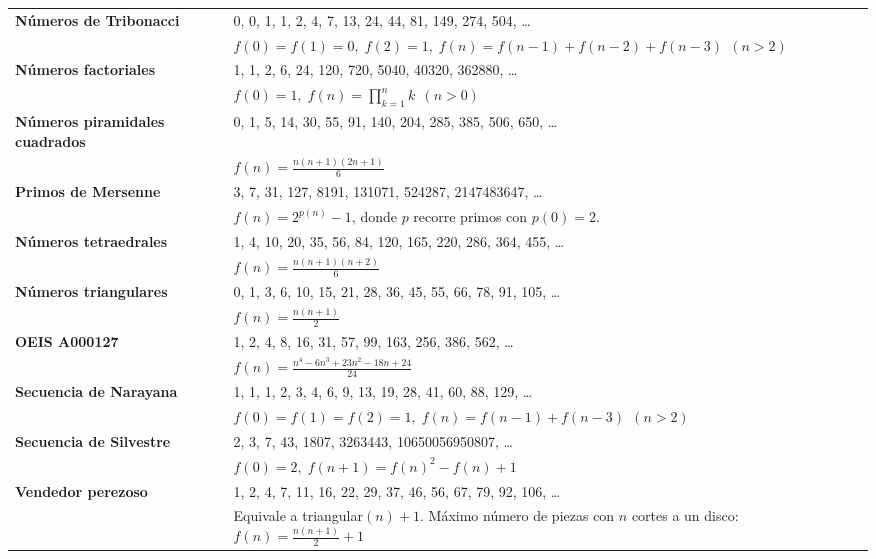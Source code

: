 \begin{center}
{\begin{tabular}{|p{}|p{}|}
\textbf{Números de Tribonacci} &
0, 0, 1, 1, 2, 4, 7, 13, 24, 44, 81, 149, 274, 504, \dots \\ \cline{2-2}
& $f(0)=f(1)=0,\; f(2)=1,\; f(n)=f(n-1)+f(n-2)+f(n-3)\ \ (n>2)$ \\ \hline

\textbf{Números factoriales} &
1, 1, 2, 6, 24, 120, 720, 5040, 40320, 362880, \dots \\ \cline{2-2}
& $f(0)=1,\; f(n)=\displaystyle\prod_{k=1}^{n} k\ \ (n>0)$ \\ \hline

\textbf{Números piramidales cuadrados} &
0, 1, 5, 14, 30, 55, 91, 140, 204, 285, 385, 506, 650, \dots \\ \cline{2-2}
& $f(n)=\displaystyle\frac{n(n+1)(2n+1)}{6}$ \\ \hline

\textbf{Primos de Mersenne} &
3, 7, 31, 127, 8191, 131071, 524287, 2147483647, \dots \\ \cline{2-2}
& $f(n)=2^{p(n)}-1$, donde $p$ recorre primos con $p(0)=2$. \\ \hline

\textbf{Números tetraedrales} &
1, 4, 10, 20, 35, 56, 84, 120, 165, 220, 286, 364, 455, \dots \\ \cline{2-2}
& $f(n)=\displaystyle\frac{n(n+1)(n+2)}{6}$ \\ \hline

\textbf{Números triangulares} &
0, 1, 3, 6, 10, 15, 21, 28, 36, 45, 55, 66, 78, 91, 105, \dots \\ \cline{2-2}
& $f(n)=\displaystyle\frac{n(n+1)}{2}$ \\ \hline

\textbf{OEIS A000127} &
1, 2, 4, 8, 16, 31, 57, 99, 163, 256, 386, 562, \dots \\ \cline{2-2}
& $f(n)=\displaystyle\frac{n^{4}-6n^{3}+23n^{2}-18n+24}{24}$ \\ \hline

\textbf{Secuencia de Narayana} &
1, 1, 1, 2, 3, 4, 6, 9, 13, 19, 28, 41, 60, 88, 129, \dots \\ \cline{2-2}
& $f(0)=f(1)=f(2)=1,\; f(n)=f(n-1)+f(n-3)\ \ (n>2)$ \\ \hline

\textbf{Secuencia de Silvestre} &
2, 3, 7, 43, 1807, 3263443, 10650056950807, \dots \\ \cline{2-2}
& $f(0)=2,\; f(n+1)=f(n)^{2}-f(n)+1$ \\ \hline

\textbf{Vendedor perezoso} &
1, 2, 4, 7, 11, 16, 22, 29, 37, 46, 56, 67, 79, 92, 106, \dots \\ \cline{2-2}
& Equivale a triangular$(n)+1$. Máximo número de piezas con $n$ cortes a un disco:
$\displaystyle f(n)=\frac{n(n+1)}{2}+1$ \\ \hline


\end{tabular}}
\end{center}
